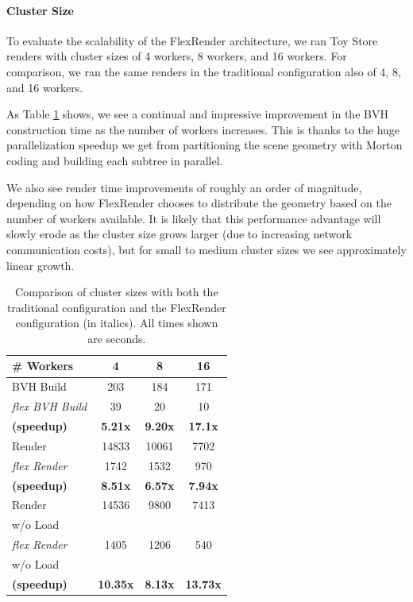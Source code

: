 \documentclass[a4paper,twoside]{article}
\begin{document}
\paragraph{Cluster Size}
To evaluate the scalability of the FlexRender architecture, we ran Toy Store
renders with cluster sizes of 4 workers, 8 workers, and 16 workers. For
comparison, we ran the same renders in the traditional configuration also of
4, 8, and 16 workers.

As Table \ref{tb:clustersize} shows, we see a continual and impressive
improvement in the BVH construction time as the number of workers increases.
This is thanks to the huge parallelization speedup we get from partitioning
the scene geometry with Morton coding and building each subtree in parallel.

We also see render time improvements of roughly an order of magnitude, depending
on how FlexRender chooses to distribute the geometry based on the number of workers
available. It is likely that this performance advantage will slowly erode as the
cluster size grows larger (due to increasing network communication costs), but
for small to medium cluster sizes we see approximately linear growth.

\begin{table}
\begin{center}
\begin{tabular}{|l||c|c|c|}
    \hline
    \# Workers & 4 & 8  & 16  \\
    \hline
    \hline
    BVH Build & 203  & 184  & 171  \\
    \hline
    \emph{ flex BVH Build } & 39  & 20  & 10  \\
    \hline
    \textbf{(speedup)} & \textbf{5.21x} & \textbf{9.20x} & \textbf{17.1x} \\
    \hline
    \hline
    Render & 14833  & 10061  & 7702  \\
    \hline
    \emph{ flex Render}& 1742  & 1532  & 970  \\
    \hline
    \textbf{(speedup)} & \textbf{8.51x} & \textbf{6.57x} & \textbf{7.94x} \\
    \hline
    \hline
    Render  & 14536  & 9800  & 7413  \\
    w/o Load& &  &  \\
    \hline
    \emph{ flex Render} & 1405  & 1206  & 540  \\
    w/o Load& &  & \\
    \hline
    \textbf{(speedup)} & \textbf{10.35x} & \textbf{8.13x} & \textbf{13.73x} \\
    \hline
\end{tabular}
\caption{Comparison of cluster sizes with both the traditional configuration and the FlexRender configuration (in italics). All times shown are seconds.}
\label{tb:clustersize}
\end{center}
\end{table}
\end{document}

